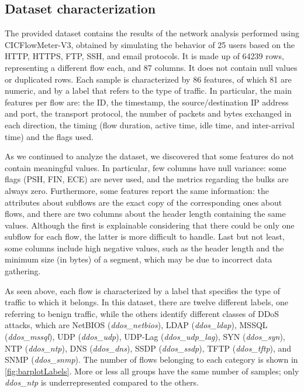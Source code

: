 \documentclass[acmlarge,nonacm]{acmart}
\begin{document}
\subsection{Dataset characterization}\label{sec:dataCharacterization}
The provided dataset contains the results of the network analysis performed using CICFlowMeter-V3, obtained by simulating the behavior of 25 users based on the HTTP, HTTPS, FTP, SSH, and email protocols.  It is made up of \num{64239} rows, representing a different flow each, and 87 columns. It does not contain null values or duplicated rows. Each sample is characterized by 86 features, of which 81 are numeric, and by a label that refers to the type of traffic. In particular, the main features per flow are: the ID, the timestamp, the source/destination IP address and port, the transport protocol, the number of packets and bytes exchanged in each direction, the timing (flow duration, active time, idle time, and inter-arrival time) and the flags used.

As we continued to analyze the dataset, we discovered that some features do not contain meaningful values. In particular, few columns have null variance: some flags (PSH, FIN, ECE) are never used, and the metrics regarding the bulks are always zero. Furthermore, some features report the same information: the attributes about subflows are the exact copy of the corresponding ones about flows, and there are two columns about the header length containing the same values. Although the first is explainable considering that there could be only one subflow for each flow, the latter is more difficult to handle. Last but not least, some columns include high negative values, such as the header length and the minimum size (in bytes) of a segment, which may be due to incorrect data gathering.

As seen above, each flow is characterized by a label that specifies the type of traffic to which it belongs. In this dataset, there are twelve different labels, one referring to benign traffic, while the others identify different classes of DDoS attacks, which are NetBIOS (\emph{ddos\_netbios}), LDAP (\emph{ddos\_ldap}), MSSQL (\emph{ddos\_mssql}), UDP (\emph{ddos\_udp}), UDP-Lag (\emph{ddos\_udp\_lag}), SYN (\emph{ddos\_syn}), NTP (\emph{ddos\_ntp}), DNS (\emph{ddos\_dns}), SSDP (\emph{ddos\_ssdp}), TFTP (\emph{ddos\_tftp}), and SNMP (\emph{ddos\_snmp}). The number of flows belonging to each category is shown in \cref{fig:barplotLabels}. More or less all groups have the same number of samples; only \emph{ddos\_ntp} is underrepresented compared to the others.
\end{document}
